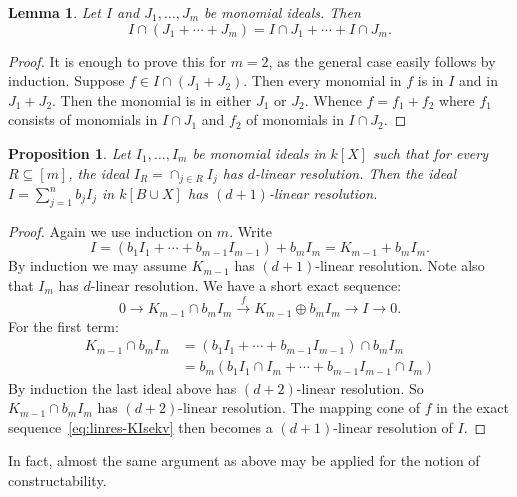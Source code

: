 \documentclass[10pt,a4paper]{article}
\newtheorem{prop}[cdrthm]{Proposition}
\newtheorem{lemma}[cdrthm]{Lemma}
\theoremstyle{definition}
\theoremstyle{remark}
\theoremstyle{plain}
\newcommand{\sus}{\subseteq}
\newcommand{\pil}{\rightarrow}
\begin{document}
\begin{lemma}
  Let $I$ and $J_1, \ldots, J_m$ be monomial ideals.
  Then
  \[ I \cap (J_1 + \cdots + J_m) = I \cap J_1 + \cdots + I \cap J_m. \]
\end{lemma}

\begin{proof}
  It is enough to prove this for $m = 2$, as the general case easily follows
  by induction. Suppose $f \in I \cap (J_1 + J_2)$. Then every monomial
  in $f$ is in $I$ and in $J_1 + J_2$. Then the monomial is in either
  $J_1$ or $J_2$. Whence $f = f_1 + f_2$ where $f_1$ consists of monomials
  in $I \cap J_1$ and $f_2$ of monomials in $I \cap J_2$.
\end{proof}

\begin{prop}
  Let $I_1, \ldots, I_m$ be monomial ideals in $k[X]$ such that for every
  $R \sus [m]$, the ideal $I_R = \cap_{j \in R} I_j$ has $d$-linear resolution.
  Then the ideal $I = \sum_{j=1}^n b_jI_j$ in $k[B \cup X]$ has
  $(d+1)$-linear resolution.
\end{prop}

\begin{proof}
  Again we use induction on $m$. Write
  \begin{equation} \label{eq:linres-KI}
    I = (b_1I_1 + \cdots + b_{m-1}I_{m-1}) + b_m I_m = K_{m-1} + b_mI_m.
    \end{equation}
    By induction we may assume $K_{m-1}$ has $(d+1)$-linear resolution. Note
    also that 
  $I_m$ has $d$-linear resolution. We have a short exact sequence:
  \begin{equation} \label{eq:linres-KIsekv}
    0 \pil K_{m-1} \cap b_mI_m \overset{f}\pil K_{m-1}
      \oplus b_m I_m \pil I \pil 0.
\end{equation}      
For the first term:
\begin{align*}
  K_{m-1} \cap b_mI_m&  = (b_1I_1 + \cdots + b_{m-1}I_{m-1}) \cap b_m I_m \\
                     &  = b_m(b_1I_1 \cap I_m + \cdots + b_{m-1} I_{m-1} \cap I_m)
\end{align*}
By induction the last ideal above has $(d+2)$-linear resolution. So
$K_{m-1} \cap b_m I_m$ has $(d+2)$-linear resolution. The mapping cone
of $f$ in the exact sequence~\eqref{eq:linres-KIsekv}
then becomes a $(d+1)$-linear resolution of $I$.
\end{proof}

In fact, almost the same argument as above may be applied for
the notion of constructability.
\end{document}

